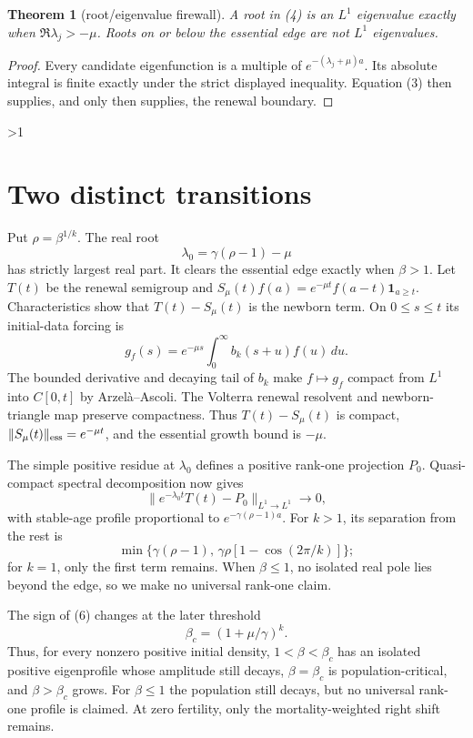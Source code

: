 \documentclass[10pt]{article}
\providecommand{\CRevisionRound}{2}
\newtheorem{theorem}{Theorem}
\begin{document}
\begin{theorem}[root/eigenvalue firewall]
A root in (4) is an $L^1$ eigenvalue exactly when
$\Re\lambda_j>-\mu$.  Roots on or below the essential edge are not
$L^1$ eigenvalues.
\end{theorem}
\begin{proof}
Every candidate eigenfunction is a multiple of
$e^{-(\lambda_j+\mu)a}$.  Its absolute integral is finite exactly under the
strict displayed inequality.  Equation (3) then supplies, and only then
supplies, the renewal boundary.
\end{proof}
\fi

\ifnum\CRevisionRound>1
\section{Two distinct transitions}
Put $\rho=\beta^{1/k}$.  The real root
\[
 \lambda_0=\gamma(\rho-1)-\mu                           \tag{6}
\]
has strictly largest real part.  It clears the essential edge exactly when
$\beta>1$.  Let $T(t)$ be the renewal semigroup and
$S_\mu(t)f(a)=e^{-\mu t}f(a-t)\mathbf1_{a\ge t}$.  Characteristics show that
$T(t)-S_\mu(t)$ is the newborn term.  On $0\le s\le t$ its initial-data
forcing is
\[
 g_f(s)=e^{-\mu s}\int_0^\infty b_k(s+u)f(u)\,du.
\]
The bounded derivative and decaying tail of $b_k$ make $f\mapsto g_f$ compact
from $L^1$ into $C[0,t]$ by Arzel\`a--Ascoli.  The Volterra renewal resolvent
and newborn-triangle map preserve compactness.  Thus $T(t)-S_\mu(t)$ is
compact, $\lVert S_\mu(t)\rVert_{\rm ess}=e^{-\mu t}$, and the essential
growth bound is $-\mu$.

The simple positive residue at $\lambda_0$ defines a positive rank-one
projection $P_0$.  Quasi-compact spectral decomposition now gives
\[
 \lVert e^{-\lambda_0t}T(t)-P_0\rVert_{L^1\to L^1}\longrightarrow0,          \tag{7}
\]
with stable-age profile proportional to $e^{-\gamma(\rho-1)a}$.  For $k>1$,
its separation from the rest is
\begin{equation}
 \min\{\gamma(\rho-1),\,\gamma\rho[1-\cos(2\pi/k)]\};    \tag{8}
\end{equation}
for $k=1$, only the first term remains.  When $\beta\le1$, no isolated real
pole lies beyond the edge, so we make no universal rank-one claim.

The sign of (6) changes at the later threshold
\begin{equation}
 \beta_c=(1+\mu/\gamma)^k.                               \tag{9}
\end{equation}
Thus, for every nonzero positive initial density, $1<\beta<\beta_c$ has an
isolated positive eigenprofile whose amplitude still decays,
$\beta=\beta_c$ is population-critical, and $\beta>\beta_c$ grows.  For
$\beta\le1$ the population still decays, but no universal rank-one profile is
claimed.  At zero fertility, only the mortality-weighted right shift remains.
\end{document}
